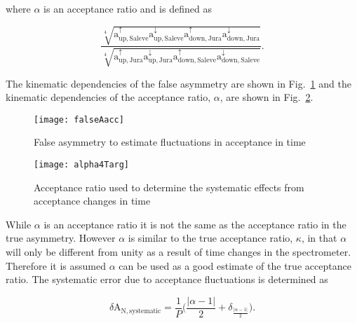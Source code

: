 \noindent
where $\alpha$ is an acceptance ratio and is defined as

\begin{equation}
  \frac{
    \sqrt[4]{
      \mathrm{a}^{\uparrow}_{\mathrm{up,Saleve}}
      \mathrm{a}^{\downarrow}_{\mathrm{up,Saleve}}
      \mathrm{a}^{\uparrow}_{\mathrm{down,Jura}}
      \mathrm{a}^{\downarrow}_{\mathrm{down,Jura}}}
  }{
    \sqrt[4]{
      \mathrm{a}^{\uparrow}_{\mathrm{up,Jura}}
      \mathrm{a}^{\downarrow}_{\mathrm{up,Jura}}
      \mathrm{a}^{\uparrow}_{\mathrm{down,Saleve}}
      \mathrm{a}^{\downarrow}_{\mathrm{down,Saleve}}}
  }.
\end{equation}

\noindent
The kinematic dependencies of the false asymmetry are shown in
Fig.~\ref{fig::falseAacc} and the kinematic dependencies of the acceptance
ratio, $\alpha$, are shown in Fig.~\ref{fig::alpha}.

\begin{figure}[h!t]
  \begin{center}
    \texttt{[image: falseAacc]}
    \caption{False asymmetry to estimate fluctuations in acceptance in time}
    \label{fig::falseAacc}
  \end{center}
\end{figure}

\begin{figure}[h!t]
  \begin{center}
    \texttt{[image: alpha4Targ]}
    \caption{Acceptance ratio used to determine the systematic effects from
      acceptance changes in time}
    \label{fig::alpha}
  \end{center}
\end{figure}

\noindent
While $\alpha$ is an acceptance ratio it is not the same as the acceptance ratio
in the true asymmetry.  However $\alpha$ is similar to the true acceptance
ratio, $\kappa$, in that $\alpha$ will only be different from unity as a result
of time changes in the spectrometer.  Therefore it is assumed $\alpha$ can be
used as a good estimate of the true acceptance ratio.  The systematic error due
to acceptance fluctuations is determined as

\begin{equation}
  \delta\mathrm{A}_{\mathrm{N,systematic}} =
  \frac{1}{P} \Big(\frac{|\alpha-1|}{2} + \delta_{\frac{|\alpha-1|}{2}} \Big).
\end{equation}

